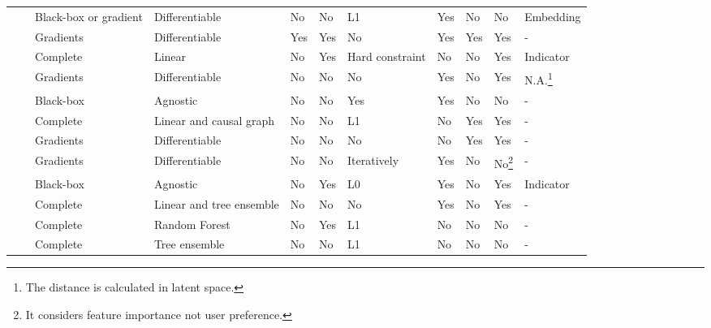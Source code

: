 \begin{table*}
{\begin{tabular}{m{}m{}m{}m{}m{}m{}m{}m{}m{}m{}m{}}
 & \citep{van_looveren_interpretable_2020} & Black-box or gradient & Differentiable & No & No & L1 & Yes & No & No & Embedding\\ %
 & \citep{mahajan_preserving_2020} & Gradients & Differentiable & Yes & Yes & No & Yes & Yes & Yes & - \\ %
 & \citep{karimi_model-agnostic_2020} & Complete & Linear & No & Yes & Hard \mbox{constraint} & No & No & Yes & Indicator \\ %
 & \citep{pawelczyk_learning_2020} & Gradients & Differentiable & No & No & No & Yes & No & Yes & N.A.\footnote{The distance is calculated in latent space.} \\ %
 & \cite{keane2020good} & Black-box & Agnostic & No & No & Yes & Yes & No & No & - \\ %
 & \citep{karimi_algorithmic_2020} & Complete & Linear and causal graph & No & No & L1 & No & Yes & Yes & - \\ %
 & \citep{karimi-imperfect:2020} & Gradients & Differentiable & No & No & No & No & Yes & Yes & - \\ %
 & \citep{Grace:2019} & Gradients & Differentiable & No & No & Iteratively & Yes & No  & No\footnote{It considers feature importance not user preference.} & - \\ %
 & \citep{dandl_multi-objective_2020} & Black-box & Agnostic & No & Yes & L0 & Yes & No & Yes & Indicator \\ %
 & \citep{Kanamori2020:DACE} & Complete & Linear and tree ensemble & No & No & No & Yes & No & Yes & - \\ %
 & \citep{fernandez-random:2020} & Complete & Random \mbox{Forest} & No & Yes & L1 & No & No & No & - \\ %
 & \citep{lucic-actionable:2020,lucic-actionable:2020-update1} & Complete & Tree ensemble & No & No & L1 & No & No & No  & - \\ %
  
 \bottomrule
 \end{tabular}

 }

\end{table*}



